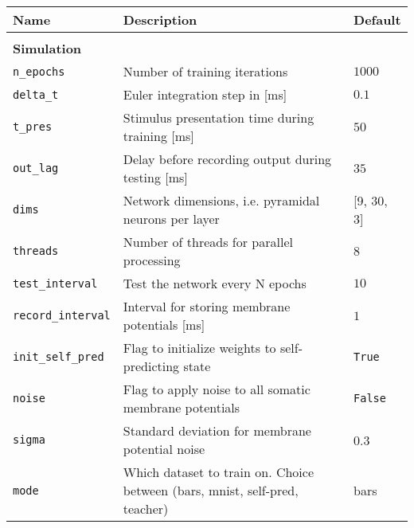 \begin{table}
  \fontsize{12pt}{12pt}\selectfont
  \begin{center}
    \begin{tabular}{p{}p{}p{}}    \hline
      \textbf{Name}                & \textbf{Description}                                                        &
      \textbf{Default}
      \\
      \hline

      \\\textbf{Simulation} \\\hline
      \texttt{n\_epochs}           & Number of training iterations                                               &
      $1000$ \\
      \texttt{delta\_t}            & Euler integration step in [ms]                                              & $0.1$
      \\
      \texttt{t\_pres}             & Stimulus presentation time during training [ms]                             & $50$
      \\
      \texttt{out\_lag}            & Delay before recording output during testing [ms]                           & $35$
      \\
      \texttt{dims}                & Network dimensions, i.e. pyramidal neurons per layer                        & [9,
          30, 3] \\
      \texttt{threads}             & Number of threads for parallel processing                                   & $8$
      \\
      \texttt{test\_interval}      & Test the network every N epochs                                             & $10$
      \\
      \texttt{record\_interval}    & Interval for storing membrane potentials [ms]                               & $1$
      \\
      \texttt{init\_self\_pred}    & Flag to initialize weights to self-predicting state                         &
      \texttt{True}
      \\
      \texttt{noise}               & Flag to apply noise to all somatic membrane potentials                      &
      \texttt{False}
      \\
      \texttt{sigma}               & Standard deviation for membrane potential noise                             & 0.3
      \\
      \texttt{mode}                & Which dataset to train on. Choice between (bars, mnist, self-pred, teacher) & bars

\end{tabular}
\end{center}
\end{table}

